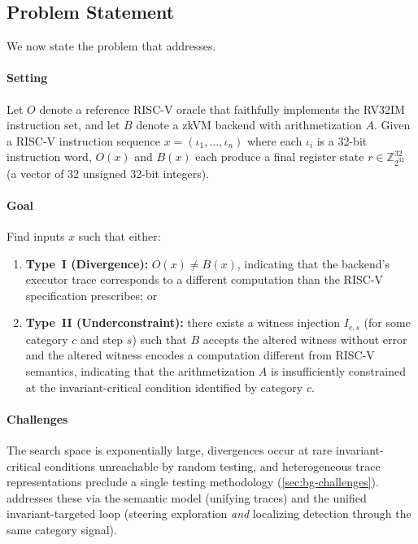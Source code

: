 \subsection{Problem Statement}\label{sec:problem-statement}

We now state the problem that \tool addresses.

\paragraph{Setting}
Let $O$ denote a reference RISC-V oracle that faithfully implements the RV32IM instruction set, and let $B$ denote a zkVM backend with arithmetization $A$. Given a RISC-V instruction sequence $x = (\iota_1, \ldots, \iota_n)$ where each $\iota_i$ is a 32-bit instruction word, $O(x)$ and $B(x)$ each produce a final register state $r \in \mathbb{Z}_{2^{32}}^{32}$ (a vector of 32 unsigned 32-bit integers).

\paragraph{Goal}
Find inputs $x$ such that either:
\begin{enumerate}
    \item \textbf{Type~I (Divergence):} $O(x) \neq B(x)$, indicating that the backend's executor trace corresponds to a different computation than the RISC-V specification prescribes; or
    \item \textbf{Type~II (Underconstraint):} there exists a witness injection $I_{c,s}$ (for some category $c$ and step $s$) such that $B$ accepts the altered witness without error and the altered witness encodes a computation different from RISC-V semantics, indicating that the arithmetization $A$ is insufficiently constrained at the invariant-critical condition identified by category $c$.
\end{enumerate}

\paragraph{Challenges}
The search space is exponentially large, divergences occur at rare invariant-critical conditions unreachable by random testing, and heterogeneous trace representations preclude a single testing methodology (\autoref{sec:bg-challenges}). \tool addresses these via the semantic model (unifying traces) and the unified invariant-targeted loop (steering exploration \emph{and} localizing detection through the same category signal).
